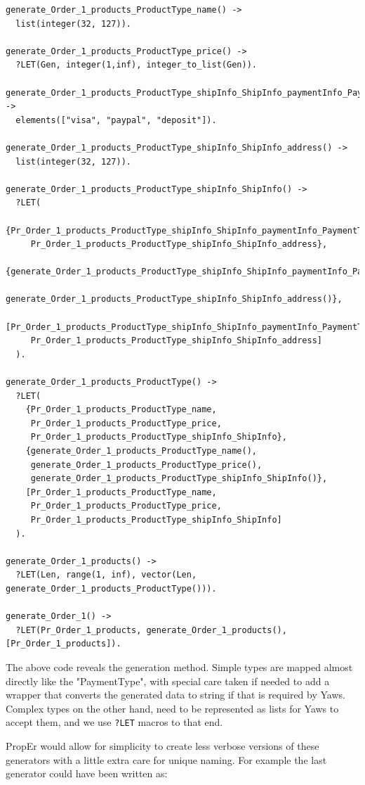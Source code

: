 \documentclass[submission,copyright,a4]{eptcs}
\newcommand{\LET}{\texttt{?LET}\xspace}
\begin{document}
\begin{lstlisting}
generate_Order_1_products_ProductType_name() -> 
  list(integer(32, 127)).

generate_Order_1_products_ProductType_price() ->  
  ?LET(Gen, integer(1,inf), integer_to_list(Gen)).

generate_Order_1_products_ProductType_shipInfo_ShipInfo_paymentInfo_PaymentType() -> 
  elements(["visa", "paypal", "deposit"]).

generate_Order_1_products_ProductType_shipInfo_ShipInfo_address() -> 
  list(integer(32, 127)).

generate_Order_1_products_ProductType_shipInfo_ShipInfo() -> 
  ?LET(
    {Pr_Order_1_products_ProductType_shipInfo_ShipInfo_paymentInfo_PaymentType,
     Pr_Order_1_products_ProductType_shipInfo_ShipInfo_address},
    {generate_Order_1_products_ProductType_shipInfo_ShipInfo_paymentInfo_PaymentType(),
     generate_Order_1_products_ProductType_shipInfo_ShipInfo_address()},
    [Pr_Order_1_products_ProductType_shipInfo_ShipInfo_paymentInfo_PaymentType,
     Pr_Order_1_products_ProductType_shipInfo_ShipInfo_address]
  ).

generate_Order_1_products_ProductType() -> 
  ?LET(
    {Pr_Order_1_products_ProductType_name, 
     Pr_Order_1_products_ProductType_price, 
     Pr_Order_1_products_ProductType_shipInfo_ShipInfo},
    {generate_Order_1_products_ProductType_name(), 
     generate_Order_1_products_ProductType_price(), 
     generate_Order_1_products_ProductType_shipInfo_ShipInfo()},
    [Pr_Order_1_products_ProductType_name, 
     Pr_Order_1_products_ProductType_price, 
     Pr_Order_1_products_ProductType_shipInfo_ShipInfo] 
  ).

generate_Order_1_products() -> 
  ?LET(Len, range(1, inf), vector(Len, generate_Order_1_products_ProductType())).

generate_Order_1() -> 
  ?LET(Pr_Order_1_products, generate_Order_1_products(), [Pr_Order_1_products]).
\end{lstlisting}

The above code reveals the generation method. Simple types are mapped almost directly 
like the "PaymentType", with special care taken if needed to add a wrapper that converts 
the generated data to string if that is required by Yaws. Complex types on the other hand, 
need to be represented as lists for Yaws to accept them, and we use \LET macros to that end. 

PropEr would allow for simplicity to create less verbose versions of these generators 
with a little extra care for unique naming. For example the last generator could have 
been written as:
\end{document}
